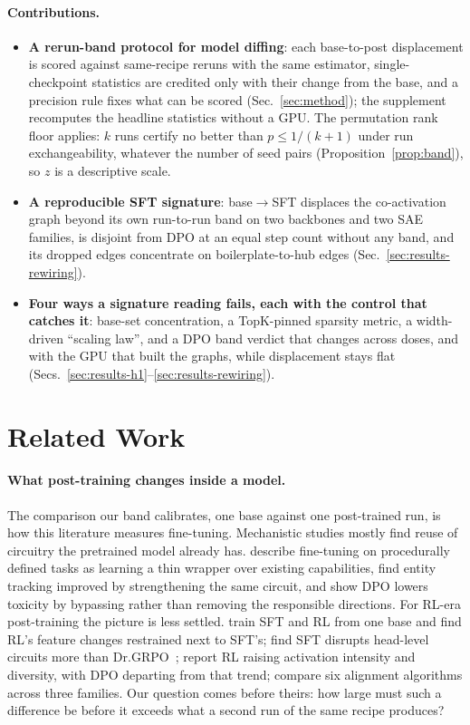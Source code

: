 \documentclass{article}
\begin{document}
\paragraph{Contributions.}
\begin{itemize}[leftmargin=*,itemsep=1pt,topsep=2pt]
\item \textbf{A rerun-band protocol for model diffing}: each base-to-post displacement is scored against same-recipe reruns with the same estimator, single-checkpoint statistics are credited only with their change from the base, and a precision rule fixes what can be scored (Sec.~\ref{sec:method}); the supplement recomputes the headline statistics without a GPU. The permutation rank floor applies: $k$ runs certify no better than $p\le1/(k+1)$ under run exchangeability, whatever the number of seed pairs (Proposition~\ref{prop:band}), so $z$ is a descriptive scale.
\item \textbf{A reproducible SFT signature}: base$\to$SFT displaces the co-activation graph beyond its own run-to-run band on two backbones and two SAE families, is disjoint from DPO at an equal step count without any band, and its dropped edges concentrate on boilerplate-to-hub edges (Sec.~\ref{sec:results-rewiring}).
\item \textbf{Four ways a signature reading fails, each with the control that catches it}: base-set concentration, a TopK-pinned sparsity metric, a width-driven ``scaling law'', and a DPO band verdict that changes across doses, and with the GPU that built the graphs, while displacement stays flat (Secs.~\ref{sec:results-h1}--\ref{sec:results-rewiring}).
\end{itemize}

\section{Related Work}
\label{sec:related}
\paragraph{What post-training changes inside a model.} The comparison our band calibrates, one base against one post-trained run, is how this literature measures fine-tuning. Mechanistic studies mostly find reuse of circuitry the pretrained model already has. \citet{jain2024mechanistic} describe fine-tuning on procedurally defined tasks as learning a thin wrapper over existing capabilities, \citet{prakash2024entity} find entity tracking improved by strengthening the same circuit, and \citet{lee2024dpo} show DPO lowers toxicity by bypassing rather than removing the responsible directions. For RL-era post-training the picture is less settled. \citet{shi2026rl_generalize} train SFT and RL from one base and find RL's feature changes restrained next to SFT's; \citet{rojasnunez2026forgetting} find SFT disrupts head-level circuits more than Dr.GRPO~\citep{liu2025drgrpo}; \citet{rl_circuit_intensity2026} report RL raising activation intensity and diversity, with DPO departing from that trend; \citet{sinha2026mechanistic} compare six alignment algorithms across three families. Our question comes before theirs: how large must such a difference be before it exceeds what a second run of the same recipe produces?
\end{document}
